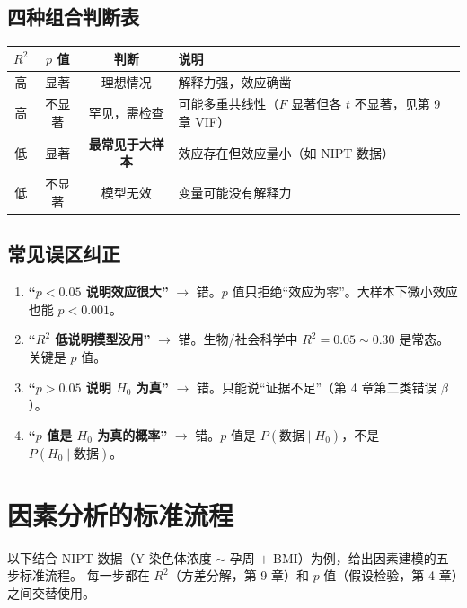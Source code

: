 \subsection{四种组合判断表}

\begin{center}
\renewcommand{\arraystretch}{1.4}
\begin{tabular}{c|c|c|l}
\toprule
\textbf{$R^2$} & \textbf{$p$ 值} & \textbf{判断} & \textbf{说明} \\
\midrule
高 & 显著 & 理想情况 & 解释力强，效应确凿 \\
高 & 不显著 & 罕见，需检查 & 可能多重共线性（$F$ 显著但各 $t$ 不显著，见第 9 章 VIF） \\
低 & 显著 & \textbf{最常见于大样本} & 效应存在但效应量小（如 NIPT 数据） \\
低 & 不显著 & 模型无效 & 变量可能没有解释力 \\
\bottomrule
\end{tabular}
\end{center}

\subsection{常见误区纠正}

\begin{enumerate}[label=(\arabic*)]
    \item \textbf{“$p < 0.05$ 说明效应很大”} $\rightarrow$ 错。$p$ 值只拒绝“效应为零”。大样本下微小效应也能 $p < 0.001$。
    \item \textbf{“$R^2$ 低说明模型没用”} $\rightarrow$ 错。生物/社会科学中 $R^2 = 0.05 \sim 0.30$ 是常态。关键是 $p$ 值。
    \item \textbf{“$p > 0.05$ 说明 $H_0$ 为真”} $\rightarrow$ 错。只能说“证据不足”（第 4 章第二类错误 $\beta$）。
    \item \textbf{“$p$ 值是 $H_0$ 为真的概率”} $\rightarrow$ 错。$p$ 值是 $P(\text{数据} \mid H_0)$，不是 $P(H_0 \mid \text{数据})$。
\end{enumerate}

\section{因素分析的标准流程}

以下结合 NIPT 数据（Y 染色体浓度 $\sim$ 孕周 $+$ BMI）为例，给出因素建模的五步标准流程。
每一步都在 $R^2$（方差分解，第 9 章）和 $p$ 值（假设检验，第 4 章）之间交替使用。

